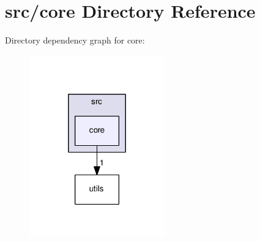 \section{src/core Directory Reference}
\label{dir_aebb8dcc11953d78e620bbef0b9e2183}
Directory dependency graph for core\+:
\nopagebreak
\begin{figure}[H]
\begin{center}
\leavevmode
\includegraphics[width=166pt]{dir_aebb8dcc11953d78e620bbef0b9e2183_dep}
\end{center}
\end{figure}
